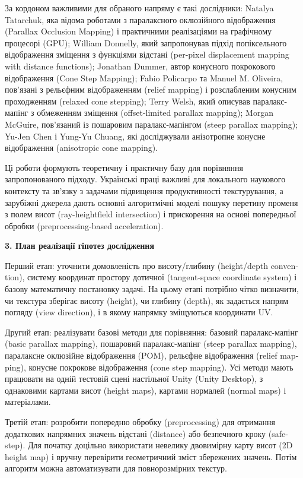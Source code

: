 \documentclass[14pt,a4paper]{extarticle}
\newcommand{\eng}[1]{\foreignlanguage{english}{#1}}
\newcommand{\sectiontitle}[1]{%
  \par\vspace{\baselineskip}%
  \noindent\textbf{#1}\par
}
\begin{document}
За кордоном важливими для обраного напряму є такі дослідники: Natalya Tatarchuk, яка відома роботами з паралаксного оклюзійного відображення (\eng{Parallax Occlusion Mapping}) і практичними реалізаціями на графічному процесорі (\eng{GPU}); William Donnelly, який запропонував підхід попіксельного відображення зміщення з функціями відстані (\eng{per-pixel displacement mapping with distance functions}); Jonathan Dummer, автор конусного покрокового відображення (\eng{Cone Step Mapping}); Fabio Policarpo та Manuel M. Oliveira, пов'язані з рельєфним відображенням (\eng{relief mapping}) і розслабленим конусним проходженням (\eng{relaxed cone stepping}); Terry Welsh, який описував паралакс-мапінг з обмеженням зміщення (\eng{offset-limited parallax mapping}); Morgan McGuire, пов'язаний із пошаровим паралакс-мапінгом (\eng{steep parallax mapping}); Yu-Jen Chen і Yung-Yu Chuang, які досліджували анізотропне конусне відображення (\eng{anisotropic cone mapping}).

Ці роботи формують теоретичну і практичну базу для порівняння запропонованого підходу. Українські праці важливі для локального наукового контексту та зв'язку з задачами підвищення продуктивності текстурування, а зарубіжні джерела дають основні алгоритмічні моделі пошуку перетину променя з полем висот (\eng{ray-heightfield intersection}) і прискорення на основі попередньої обробки (\eng{preprocessing-based acceleration}).

\sectiontitle{3. План реалізації гіпотез дослідження}

Перший етап: уточнити домовленість про висоту/глибину (\eng{height/depth convention}), систему координат простору дотичної (\eng{tangent-space coordinate system}) і базову математичну постановку задачі. На цьому етапі потрібно чітко визначити, чи текстура зберігає висоту (\eng{height}), чи глибину (\eng{depth}), як задається напрям погляду (\eng{view direction}), і в якому напрямку зміщуються координати UV.

Другий етап: реалізувати базові методи для порівняння: базовий паралакс-мапінг (\eng{basic parallax mapping}), пошаровий паралакс-мапінг (\eng{steep parallax mapping}), паралаксне оклюзійне відображення (POM), рельєфне відображення (\eng{relief mapping}), конусне покрокове відображення (\eng{cone step mapping}). Усі методи мають працювати на одній тестовій сцені настільної Unity (\eng{Unity Desktop}), з однаковими картами висот (\eng{height maps}), картами нормалей (\eng{normal maps}) і матеріалами.

Третій етап: розробити попередню обробку (\eng{preprocessing}) для отримання додаткових напрямних значень відстані (\eng{distance}) або безпечного кроку (\eng{safe-step}). Для початку доцільно використати невелику двовимірну карту висот (\eng{2D height map}) і вручну перевірити геометричний зміст збережених значень. Потім алгоритм можна автоматизувати для повнорозмірних текстур.
\end{document}
